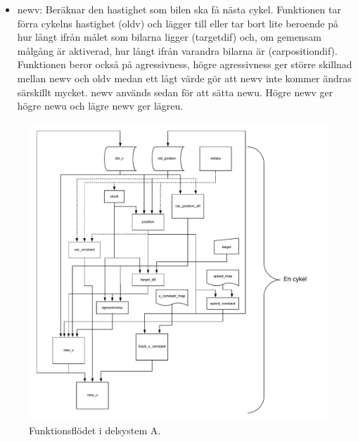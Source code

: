 \begin{itemize}
\item new\textunderscore v: Beräknar den hastighet som bilen ska få nästa cykel. Funktionen tar förra cykelns hastighet (old\textunderscore v) 
och lägger till eller tar bort lite beroende på hur långt ifrån målet som bilarna ligger (target\textunderscore dif) och, om gemensam
målgång är aktiverad, hur långt ifrån varandra bilarna är (car\textunderscore position\textunderscore dif). Funktionen beror 
också på agressivness, högre agressivness ger större skillnad mellan new\textunderscore v och old\textunderscore v medan ett lågt värde gör att new\textunderscore v 
inte kommer ändras särskillt mycket.
new\textunderscore v används sedan för att sätta
new\textunderscore u. Högre new\textunderscore v ger högre new\textunderscore u och lägre new\textunderscore v ger lägre\textunderscore u. 
    \end{itemize}

    \begin{figure}
      \centering
      \includegraphics[width=\linewidth]{figures/flow.pdf}
      \caption{Funktionsflödet i delsystem A.}%
      \label{fig:flow_diagram}
    \end{figure}

